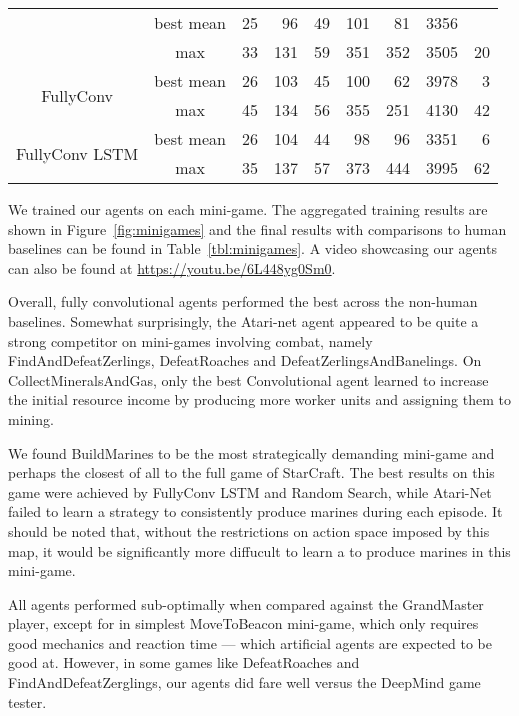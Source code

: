 \documentclass{article}
\begin{document}
\begin{table}[]
\begin{tabular}{c|c|rrrrrrr}
    & \sc best mean &  25   & 96 & 49   & 101  & 81    & 3356    &  \\
    & \sc max       & 33   & 131 & 59   & 351  & 352   & 3505    & 20  \\ \hline
\multirow{2}{*}{\sc FullyConv}
    & \sc best mean & 26   & 103 & 45   & 100  & 62    & 3978    & 3   \\
    & \sc max       & 45   & 134 & 56   & 355  & 251   & 4130    & 42  \\ \hline
\multirow{2}{*}{\sc FullyConv LSTM}
    & \sc best mean & 26   & 104 & 44   & 98   & 96    & 3351    & 6   \\
    & \sc max       & 35   & 137 & 57   & 373  & 444   & 3995    & 62
\end{tabular}
\end{table}

We trained our agents on each mini-game. 
The aggregated training results are shown in Figure~\ref{fig:minigames} and the final results with comparisons to human baselines can be found in Table~\ref{tbl:minigames}. A video showcasing our agents can also be found at \url{https://youtu.be/6L448yg0Sm0}.

Overall, fully convolutional agents performed the best across the non-human baselines.
Somewhat surprisingly, the Atari-net agent appeared to be quite a strong competitor on mini-games involving combat, namely FindAndDefeatZerlings, DefeatRoaches and DefeatZerlingsAndBanelings.
On CollectMineralsAndGas, only the best Convolutional agent learned to increase the initial resource income by producing more worker units and assigning them to mining.

We found BuildMarines to be the most strategically demanding mini-game and perhaps the closest of all to the full game of StarCraft. The best results on this game were achieved by FullyConv LSTM and Random Search, while Atari-Net failed to learn a strategy to consistently produce marines during each episode.
It should be noted that, without the restrictions on action space imposed by this map, it would be significantly more diffucult to learn a to produce marines in this mini-game.

All agents performed sub-optimally when compared against the GrandMaster player, except for in simplest MoveToBeacon mini-game, which only requires good mechanics and reaction time --- which artificial agents are expected to be good at. However, in some games like DefeatRoaches and FindAndDefeatZerglings, our agents did fare well versus the DeepMind game tester.
\end{document}

